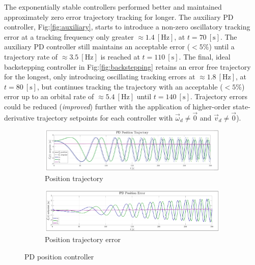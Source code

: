 The exponentially stable controllers performed better and maintained approximately zero error trajectory tracking for longer. The auxiliary PD controller, Fig:\ref{fig:auxiliary}, starts to introduce a non-zero oscillatory tracking error at a tracking frequency only greater $\approx 1.4~[\text{Hz}]$, at $t=70~[\text{s}]$. The auxiliary PD controller still maintains an acceptable error ($<5\%$) until a trajectory rate of $\approx 3.5~[\text{Hz}]$ is reached at $t=110~[\text{s}]$. The final, ideal backstepping controller in Fig:\ref{fig:backstepping} retains an error free trajectory for the longest, only introducing oscillating tracking errors at $\approx 1.8~[\text{Hz}]$, at $t=80~[\text{s}]$, but continues tracking the trajectory with an acceptable ($<5\%$) error up to an orbital rate of $\approx 5.4~[\text{Hz}]$ until $t=140~[\text{s}]$. Trajectory errors could be reduced (\emph{improved}) further with the application of higher-order state-derivative trajectory setpoints for each controller with $\vec{\omega}_d\not=\vec{0}$ and $\vec{v}_d\not=\vec{0}$).
\newpage
\begin{figure}[htbp]
\centering
\vspace{-8pt}
\begin{subfigure}{0.9\textwidth}
\centering
\includegraphics[width=\textwidth]{graphs/PD_Position_Trajectory}
\vspace{-18pt}
\caption{Position trajectory}
\label{fig:pd_position_trajectory}
\end{subfigure}
\begin{subfigure}{0.9\textwidth}
\centering
\includegraphics[width=\textwidth]{graphs/PD_Position_Error}
\vspace{-18pt}
\caption{Position trajectory error}
\label{fig:pd_position_error}
\end{subfigure}
\vspace{-10pt}
\caption{PD position controller}
\label{fig:pd_position}
\end{figure}
